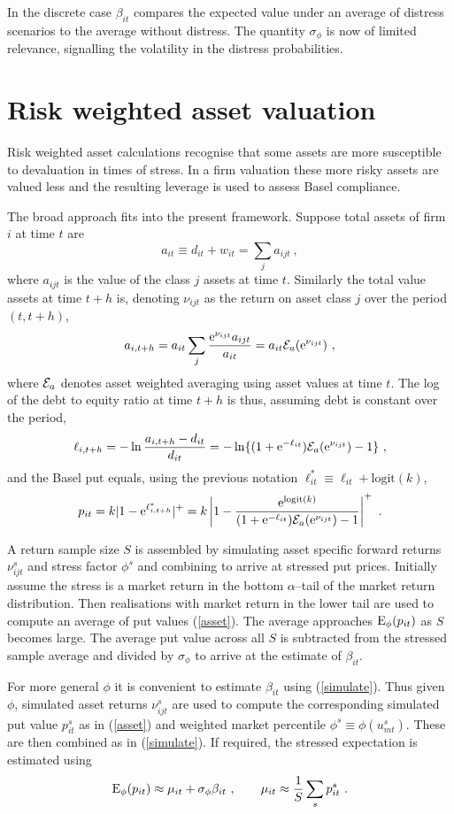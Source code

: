 \documentclass[authoryear]{elsarticle}
\newcommand{\logit}{\mathrm{logit}}
\newcommand{\e}{\mathrm{e}}
\newcommand{\Ex}{{\cal E}}
\newcommand{\eref}[1]{(\ref{#1})}
\newcommand{\cq}{\ , \qquad}
\newcommand{\be}[1]{\begin{equation}\label{#1}}
\newcommand{\ee}{\end{equation}}
\begin{document}
In the discrete case $\beta_{it}$ compares the expected value under an average of distress scenarios to the average without distress.  The quantity $\sigma_\phi$ is now of limited relevance, signalling the volatility in the distress probabilities. 

   

\section{Risk weighted asset valuation}

Risk weighted asset calculations recognise that some assets are more susceptible to  devaluation in times of stress.  In a firm  valuation these more risky assets are  valued less and the  resulting leverage is used to assess Basel compliance.

The broad approach fits into the present framework.   Suppose total assets of firm $i$ at time $t$ are
$$
a_{it}\equiv d_{it}+w_{it}  = \sum_j a_{ijt} \ ,
$$
where  $a_{ijt}$ is the value of the class  $j$ assets at time $t$.   Similarly the total value assets at time $t+h$ is, denoting $\nu_{ijt}$ as the return on asset class $j$ over the period $(t,t+h)$, 
$$
 a_{i,t+h} = a_{it}\sum_j \frac{\e^{\nu_{ijt}}a_{ijt}}{a_{it}} = a_{it}\Ex_a(\e^{\nu_{ijt}})\ ,
$$
where $\Ex_a$ denotes asset weighted averaging using asset values at time $t$.
The log of the debt to equity ratio at time $t+h$ is thus, assuming debt is constant over the period,
$$
\ell_{i,t+h} = -\ln \frac{a_{i,t+h}-d_{it}}{d_{it}} = -\ln\{(1+\e^{-\ell_{it}})\Ex_a(\e^{\nu_{ijt}})-1\}\ ,
$$
and the Basel put equals, using the previous notation $\ell_{it}^*\equiv\ell_{it}+\logit(k)$,
\be{asset}
p_{it} = k|1-\e^{\ell^*_{i,t+h}}|^+ = k\left|1-\frac{\e^{\logit(k)}}{(1+\e^{-\ell_{it}})\Ex_a(\e^{\nu_{ijt}})-1}\right|^+ \ .
\ee

A return sample size $S$ is assembled by simulating asset specific forward returns $\nu^s_{ijt}$ and  stress factor $\phi^s$ and combining to arrive at stressed put prices.   Initially assume the stress  is a market return in the bottom $\alpha$--tail of the market return  distribution.   Then realisations with market return in the lower tail  are used to compute an average  of put values \eref{asset}.  The average approaches $\mathrm{E}_\phi(p_{it})$ as $S$ becomes large.   The average put value across all $S$ is  subtracted from the stressed sample average and divided by $\sigma_\phi$  to arrive at the estimate of $\beta_{it}$. 

For more general $\phi$ it is  convenient to estimate $\beta_{it}$ using \eref{simulate}.   Thus given $\phi$, simulated asset returns $\nu_{ijt}^s$ are used to compute the corresponding simulated put value $p_{it}^s$ as in \eref{asset} and weighted market percentile $\phi^s\equiv \phi(u^s_{mt})$.   These are then combined as in \eref{simulate}.   If required, the stressed expectation is estimated using 
$$
\Es(p_{it}) \approx \mu_{it} + \sigma_\phi\beta_{it}\cq \mu_{it} \approx \frac{1}{S}\sum_s p_{it}^s\ .
$$
\end{document}
